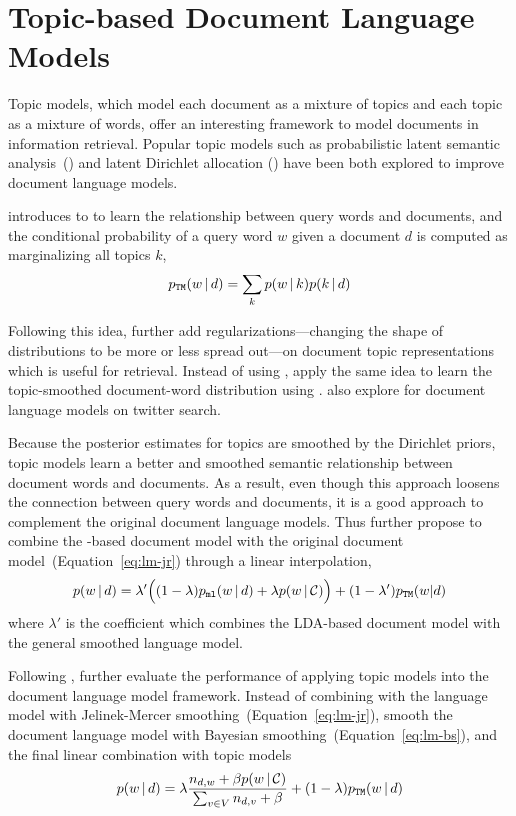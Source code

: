 \section{Topic-based Document Language Models}

Topic models, which model each document as a mixture of topics and
each topic as a mixture of words, offer an interesting framework to
model documents in information retrieval. Popular topic models such as
probabilistic latent semantic analysis~(\plsa{}) and latent Dirichlet allocation ()
have been both explored to improve document language models.

\citet{hofmann-99a} introduces \plsa{} to
to learn the relationship between query words and documents,
and the conditional probability of a query word $w$ given a document $d$ is
computed as marginalizing all topics $k$,
\begin{align}
p_{\texttt{TM}}(w \, | \, d) = \sum_{k} p(w \, | \, k) p(k \, | \, d)
\end{align}

Following this idea, \citet{Wang-2013} further add
regularizations---changing the shape of distributions to be more or
less spread out---on document topic representations 
which is useful for retrieval. Instead of using \plsa{}, \citet{wei-06} apply the same idea to 
learn the topic-smoothed document-word distribution using .
\citet{Vosecky-2014} also explore  for document language models on  twitter search.

Because the posterior estimates for topics are smoothed by the Dirichlet priors, topic models learn a better and
smoothed semantic relationship between document words and documents. As a result,
even though this approach loosens the connection between query words and documents,
it is a good approach to complement the original document language models. 
Thus \citet{wei-06} further propose to combine the
-based document model with the original document
model~(Equation~\ref{eq:lm-jr}) through a linear interpolation,
\begin{align}
p(w \, | \, d) = \lambda' \Big( (1 - \lambda) p_{\texttt{ml}}(w \, | \, d) + \lambda
p(w \, | \, \mathcal{C}) \Big) + (1 - \lambda') p_{\texttt{TM}}(w|d)
\end{align}
where $\lambda'$ is the coefficient which combines the LDA-based
document model with the general smoothed language model.

Following \citet{wei-06}, \citet{Lu-2011} further evaluate the
performance of applying topic models into the document language model
framework. Instead of combining with the language model with
Jelinek-Mercer smoothing~(Equation~\ref{eq:lm-jr}), \citet{Lu-2011}
smooth the document language model with Bayesian
smoothing~(Equation~\ref{eq:lm-bs}), and the final linear combination
with topic models
\begin{align}
p(w \, | \, d) = \lambda \frac{n_{d,w} + \beta p(w \, | \, \mathcal{C})}{\sum_{v
  \in V} n_{d,v} + \beta}  + (1 - \lambda) p_{\texttt{TM}}(w \, | \, d)
\end{align}

